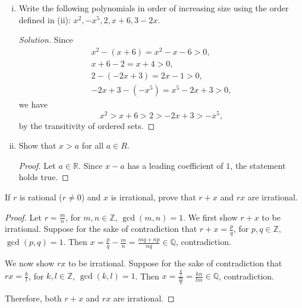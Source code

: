 \documentclass[addpoints, 11pt]{exam}
\newcommand*{\Z}{\mathbb{Z}}
\newcommand*{\Q}{\mathbb{Q}}
\newcommand*{\R}{\mathbb{R}}
\newenvironment{question}[1]{\smallskip\noindent\color{crimson}{\bf Question #1.}}{}
\begin{document}
\begin{enumerate}[(i)]
    \color{crimson}
    \item  Write the following polynomials in order of increasing size using the order defined in (ii): $x^2, -x^5, 2, x + 6, 3 - 2x$.
    \normalcolor
    
    \begin{proof}[Solution]
        Since
        \begin{gather*}
            x^2 - (x + 6) = x^2 - x - 6 > 0, \\
            x + 6 - 2  = x + 4 > 0, \\
            2 - (-2x + 3) = 2x -1 > 0, \\
            -2x + 3 - (-x^5) = x^5 -2x + 3 > 0,
        \end{gather*}
        we have 
        \[
            x^2 > x + 6 > 2 > -2x + 3 > -x^5,
        \]
        by the transitivity of ordered sets.
    \end{proof}

    \color{crimson}
    \item  Show that $x > a$ for all $a \in R$.
    \normalcolor
    
    \begin{proof}
        Let $a \in \R$. Since $x - a$ has a leading coefficient of $1$, the statement holds true. 
    \end{proof}
\end{enumerate}

\newpage

\begin{question}{E1}
    If $r$ is rational ($r \neq 0$) and $x$ is irrational, prove that $r + x$ and $rx$ are irrational.
\end{question}

\begin{proof}
    Let $r = \frac{m}{n}$, for $m, n \in \Z$, $\gcd(m,n) = 1$. We first show $r + x$ to be irrational. Suppose for the sake of contradiction that $r + x = \frac{p}{q}$, for $p, q \in \Z$, $\gcd(p,q) = 1$. Then $x = \frac{p}{q} - \frac{m}{n} = \frac{mq + np}{nq} \in \Q$, contradiction. 

    We now show $rx$ to be irrational. Suppose for the sake of contradiction that $rx = \frac{k}{l}$, for $k, l \in \Z$, $\gcd(k,l) = 1$. Then $x = \frac{\frac{k}{l}}{\frac{m}{n}} = \frac{kn}{lm} \in \Q$, contradiction.

    Therefore, both $r + x$ and $rx$ are irrational.
\end{proof}

\newpage
\end{document}
